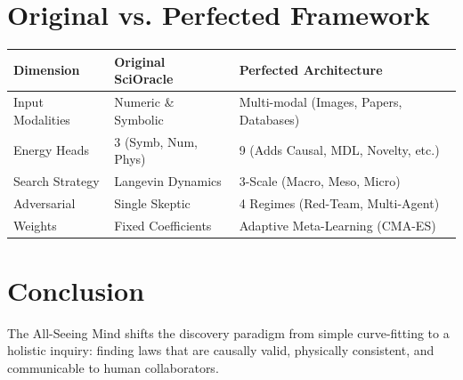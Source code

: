 \documentclass[11pt,a4paper]{article}
\begin{document}
\section{Original vs. Perfected Framework}
\begin{table}[h!]
\centering
\footnotesize
\begin{tabular}{@{}p{2.5cm} p{5.5cm} p{5.5cm}@{}}
\toprule
\textbf{Dimension} & \textbf{Original SciOracle} & \textbf{Perfected Architecture} \\ \midrule
Input Modalities & Numeric \& Symbolic & Multi-modal (Images, Papers, Databases) \\
Energy Heads & 3 (Symb, Num, Phys) & 9 (Adds Causal, MDL, Novelty, etc.) \\
Search Strategy & Langevin Dynamics & 3-Scale (Macro, Meso, Micro) \\
Adversarial & Single Skeptic & 4 Regimes (Red-Team, Multi-Agent) \\
Weights & Fixed Coefficients & Adaptive Meta-Learning (CMA-ES) \\
\bottomrule
\end{tabular}
\end{table}

\section{Conclusion}
The All-Seeing Mind shifts the discovery paradigm from simple curve-fitting to a holistic inquiry: finding laws that are causally valid, physically consistent, and communicable to human collaborators.
\end{document}
